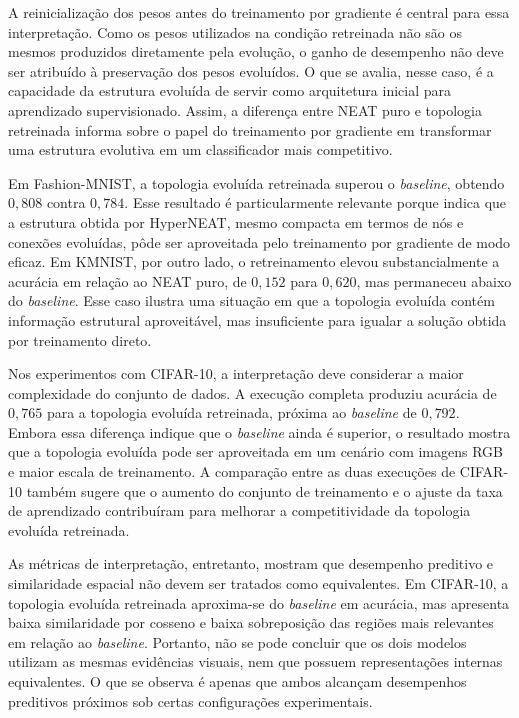 A reinicialização dos pesos antes do treinamento por gradiente é central para essa interpretação. Como os pesos utilizados na condição retreinada não são os mesmos produzidos diretamente pela evolução, o ganho de desempenho não deve ser atribuído à preservação dos pesos evoluídos. O que se avalia, nesse caso, é a capacidade da estrutura evoluída de servir como arquitetura inicial para aprendizado supervisionado. Assim, a diferença entre NEAT puro e topologia retreinada informa sobre o papel do treinamento por gradiente em transformar uma estrutura evolutiva em um classificador mais competitivo.

Em Fashion-MNIST, a topologia evoluída retreinada superou o \textit{baseline}, obtendo $0{,}808$ contra $0{,}784$. Esse resultado é particularmente relevante porque indica que a estrutura obtida por HyperNEAT, mesmo compacta em termos de nós e conexões evoluídas, pôde ser aproveitada pelo treinamento por gradiente de modo eficaz. Em KMNIST, por outro lado, o retreinamento elevou substancialmente a acurácia em relação ao NEAT puro, de $0{,}152$ para $0{,}620$, mas permaneceu abaixo do \textit{baseline}. Esse caso ilustra uma situação em que a topologia evoluída contém informação estrutural aproveitável, mas insuficiente para igualar a solução obtida por treinamento direto.

Nos experimentos com CIFAR-10, a interpretação deve considerar a maior complexidade do conjunto de dados. A execução completa produziu acurácia de $0{,}765$ para a topologia evoluída retreinada, próxima ao \textit{baseline} de $0{,}792$. Embora essa diferença indique que o \textit{baseline} ainda é superior, o resultado mostra que a topologia evoluída pode ser aproveitada em um cenário com imagens RGB e maior escala de treinamento. A comparação entre as duas execuções de CIFAR-10 também sugere que o aumento do conjunto de treinamento e o ajuste da taxa de aprendizado contribuíram para melhorar a competitividade da topologia evoluída retreinada.

As métricas de interpretação, entretanto, mostram que desempenho preditivo e similaridade espacial não devem ser tratados como equivalentes. Em CIFAR-10, a topologia evoluída retreinada aproxima-se do \textit{baseline} em acurácia, mas apresenta baixa similaridade por cosseno e baixa sobreposição das regiões mais relevantes em relação ao \textit{baseline}. Portanto, não se pode concluir que os dois modelos utilizam as mesmas evidências visuais, nem que possuem representações internas equivalentes. O que se observa é apenas que ambos alcançam desempenhos preditivos próximos sob certas configurações experimentais.


